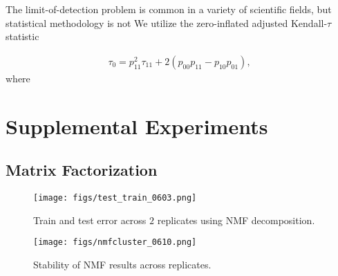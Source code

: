 The limit-of-detection problem is common in a variety of scientific fields, but statistical methodology is not 
We utilize the zero-inflated adjusted Kendall-$\tau$ statistic

\begin{align*}
    \tau_0 = p_{11}^2 \tau_11 + 2(p_{00} p_{11} - p_{10} p_{01}),
\end{align*}
where \citep{Pimentel2009KendallsTA, Albasi2018-iv}


\section{Supplemental Experiments}

\subsection{Matrix Factorization}

\begin{figure}[H]
    \centering
    \texttt{[image: figs/test\_train\_0603.png]} 
    \label{fig:distances}
    \caption{Train and test error across $2$  replicates using NMF decomposition.}
\end{figure}

\begin{figure}[H]
    \centering
    \texttt{[image: figs/nmfcluster\_0610.png]} 
    \label{fig:distances}
    \caption{Stability of NMF results across replicates.}
\end{figure}


















